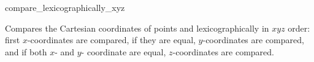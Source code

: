 \begin{ccRefFunction}{compare_lexicographically_xyz}

      {Compares the Cartesian coordinates of points  and
        lexicographically in $xyz$ order: first 
       $x$-coordinates are compared, if they are equal, $y$-coordinates
       are compared, and if both $x$- and $y$- coordinate are equal,
       $z$-coordinates are compared.}
\end{ccRefFunction}


